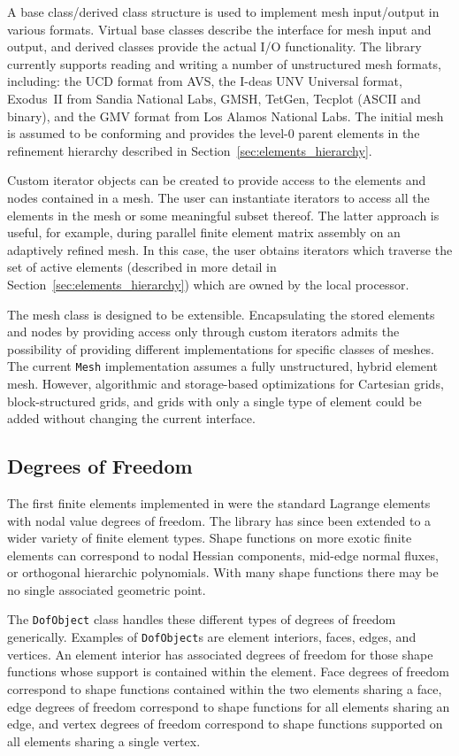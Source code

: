 A base class/derived class structure is used to implement mesh input/output in
various formats.  Virtual base classes describe the interface for mesh
input and output, and derived classes provide the actual I/O
functionality.  The library currently supports reading and writing a
number of unstructured mesh formats, including: the UCD format from
AVS, the I-deas UNV Universal format, Exodus~II from Sandia National
Labs, GMSH, TetGen, Tecplot (ASCII and binary), and the GMV format from Los
Alamos National Labs.  The initial mesh is assumed to be conforming
and provides the level-0 parent elements in the refinement hierarchy
described in Section~\ref{sec:elements_hierarchy}.

Custom iterator objects can be created to provide access to the
elements and nodes contained in a mesh.  The user can instantiate
iterators to access all the elements in the mesh or some meaningful
subset thereof.  The latter approach is useful, for example, during
parallel finite element matrix assembly on an adaptively refined mesh.
In this case, the user obtains iterators which traverse the set of
active elements (described in more detail in
Section~\ref{sec:elements_hierarchy}) which are owned by the local
processor.

The mesh class is designed to be extensible.  Encapsulating the stored
elements and nodes by providing access only through custom iterators
admits the possibility of providing different implementations for
specific classes of meshes.  The current \texttt{Mesh} implementation
assumes a fully unstructured, hybrid element mesh.  However,
algorithmic and storage-based optimizations for Cartesian grids,
block-structured grids, and grids with only a single type of element
could be added without changing the current interface.


\subsection{Degrees of Freedom\label{sec:dof_distribution}}
\enlargethispage{-\baselineskip}
The first finite elements implemented in \libMesh{} were the standard
Lagrange elements with nodal value degrees of freedom.  The library
has since been extended to a wider variety of finite element types.
Shape functions on more exotic finite elements can correspond to nodal
Hessian components, mid-edge normal fluxes, or orthogonal hierarchic
polynomials.  With many shape functions there may be no single
associated geometric
point.

The \texttt{DofObject} class handles these different types of 
degrees of freedom generically.  Examples of \texttt{DofObject}s
are element interiors, faces, edges, and vertices.  An element interior
has associated degrees of freedom for those shape functions whose
support is contained within the element.  Face degrees of
freedom correspond to shape functions contained within the two
elements sharing a face, edge degrees of freedom correspond to shape
functions for all elements sharing an edge, and vertex degrees of
freedom correspond to shape functions supported on all elements
sharing a single vertex.


